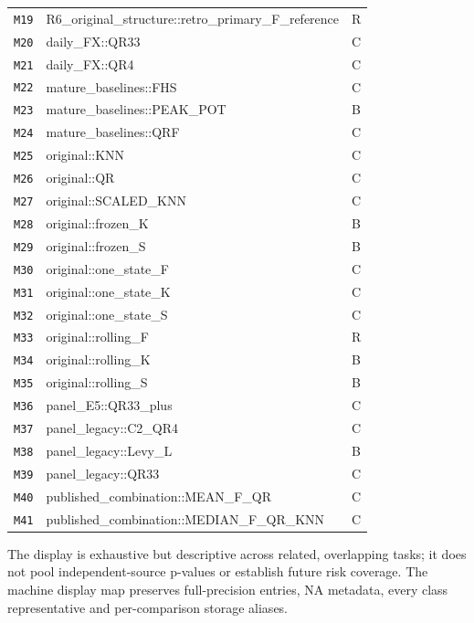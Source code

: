 \begin{longtable}{@{}lp{118mm}l@{}}
\texttt{M19} & R6\_\allowbreak{}original\_\allowbreak{}structure::\allowbreak{}retro\_\allowbreak{}primary\_\allowbreak{}F\_\allowbreak{}reference & R \\
\texttt{M20} & daily\_\allowbreak{}FX::\allowbreak{}QR33 & C \\
\texttt{M21} & daily\_\allowbreak{}FX::\allowbreak{}QR4 & C \\
\texttt{M22} & mature\_\allowbreak{}baselines::\allowbreak{}FHS & C \\
\texttt{M23} & mature\_\allowbreak{}baselines::\allowbreak{}PEAK\_\allowbreak{}POT & B \\
\texttt{M24} & mature\_\allowbreak{}baselines::\allowbreak{}QRF & C \\
\texttt{M25} & original::\allowbreak{}KNN & C \\
\texttt{M26} & original::\allowbreak{}QR & C \\
\texttt{M27} & original::\allowbreak{}SCALED\_\allowbreak{}KNN & C \\
\texttt{M28} & original::\allowbreak{}frozen\_\allowbreak{}K & B \\
\texttt{M29} & original::\allowbreak{}frozen\_\allowbreak{}S & B \\
\texttt{M30} & original::\allowbreak{}one\_\allowbreak{}state\_\allowbreak{}F & C \\
\texttt{M31} & original::\allowbreak{}one\_\allowbreak{}state\_\allowbreak{}K & C \\
\texttt{M32} & original::\allowbreak{}one\_\allowbreak{}state\_\allowbreak{}S & C \\
\texttt{M33} & original::\allowbreak{}rolling\_\allowbreak{}F & R \\
\texttt{M34} & original::\allowbreak{}rolling\_\allowbreak{}K & B \\
\texttt{M35} & original::\allowbreak{}rolling\_\allowbreak{}S & B \\
\texttt{M36} & panel\_\allowbreak{}E5::\allowbreak{}QR33\_\allowbreak{}plus & C \\
\texttt{M37} & panel\_\allowbreak{}legacy::\allowbreak{}C2\_\allowbreak{}QR4 & C \\
\texttt{M38} & panel\_\allowbreak{}legacy::\allowbreak{}Levy\_\allowbreak{}L & B \\
\texttt{M39} & panel\_\allowbreak{}legacy::\allowbreak{}QR33 & C \\
\texttt{M40} & published\_\allowbreak{}combination::\allowbreak{}MEAN\_\allowbreak{}F\_\allowbreak{}QR & C \\
\texttt{M41} & published\_\allowbreak{}combination::\allowbreak{}MEDIAN\_\allowbreak{}F\_\allowbreak{}QR\_\allowbreak{}KNN & C \\
\bottomrule
\end{longtable}
\noindent The display is exhaustive but descriptive across related, overlapping tasks; it does not pool independent-source p-values or establish future risk coverage. The machine display map preserves full-precision entries, NA metadata, every class representative and per-comparison storage aliases.
\endgroup
